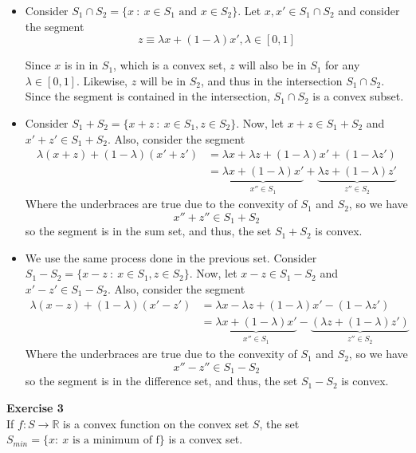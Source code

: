 \documentclass[11pt,table]{article}
\newenvironment{problem}[2][Exercise]
    { \begin{mdframed}[backgroundcolor=gray!20] \textbf{#1 #2} \\}
    {  \end{mdframed}}
\begin{document}
\begin{itemize}
	\item Consider \(S_{1} \cap S_{2}  =  \{x \ : \ x \in S_{1} \text{ and } x \in S_{2}\}\). Let \(x,x' \in S_1 \cap S_2\) and consider the segment
	\[
		z \equiv \lambda x + (1-\lambda)x', \lambda \in [0,1]
	\]
	
	Since \(x\) is in in \(S_1\), which is a convex set, \(z\) will also be in \(S_1\) for any \(\lambda \in [0,1]\). Likewise, \(z\) will be in \(S_2\), and thus in the intersection \(S_{1} \cap S_{2}\). Since the segment is contained in the intersection, \(S_{1} \cap S_{2}\) is a convex subset.
	
	\item Consider \(S_{1} + S_{2}  =  \{x + z \ : \ x \in S_{1}, z \in S_{2}\}\). Now, let \(x+z \in S_1 + S_2\) and \(x'+z' \in S_1+S_2\). Also, consider the segment
	\begin{align*}
		\lambda(x+z) + (1-\lambda)(x'+z') & = \lambda x + \lambda z + (1-\lambda)x' + (1-\lambda z')\\
		& = \underbrace{\lambda x +(1-\lambda)x'}_{x'' \in S_1} + \underbrace{\lambda z + (1-\lambda)z'}_{z'' \in S_2}  
	\end{align*}
	Where the underbraces are true due to the convexity of \(S_1\) and \(S_2\), so we have
	\[
	x'' + z'' \in S_1 + S_2   
	\]
	so the segment is in the sum set, and thus, the set \(S_1 + S_2\) is convex.
	
	\item We use the same process done in the previous set. Consider \(S_{1} - S_{2}  =  \{x - z \ : \ x \in S_{1}, z \in S_{2}\}\). Now, let \(x-z \in S_1 - S_2\) and \(x'-z' \in S_1-S_2\). Also, consider the segment
	\begin{align*}
	\lambda(x-z) + (1-\lambda)(x'-z') & = \lambda x - \lambda z + (1-\lambda)x' - (1-\lambda z')\\
	& = \underbrace{\lambda x +(1-\lambda)x'}_{x'' \in S_1} - \underbrace{\left( \lambda z + (1-\lambda)z'\right)}_{z'' \in S_2}  
	\end{align*}
	Where the underbraces are true due to the convexity of \(S_1\) and \(S_2\), so we have
	\[
	x'' - z'' \in S_1 - S_2   
	\]
	so the segment is in the difference set, and thus, the set \(S_1 - S_2\) is convex.
\end{itemize}

\begin{problem}{3}
  If \( f: S \to \mathbb{R} \) is a convex function on the convex set \( S \), the set \( S_{min} = \{x : \ x \text{ is a minimum of f} \} \) is a convex set.
\end{problem}
\end{document}
